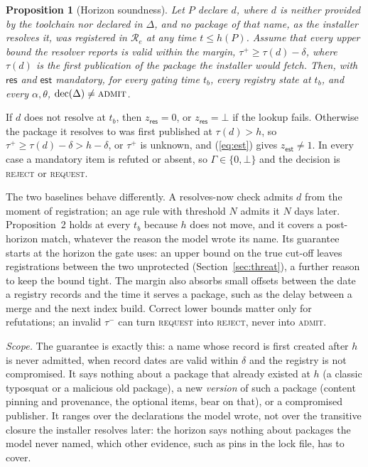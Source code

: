\documentclass[conference]{IEEEtran}
\newcommand{\sres}{\mathsf{res}}
\newcommand{\sest}{\mathsf{est}}
\newcommand{\dec}[1]{\textsc{#1}}
\newcommand{\Reg}{\mathcal{R}}
\newcommand{\Dec}{\mathrm{dec}}
\newtheorem{proposition}{Proposition}
\begin{document}
\begin{proposition}[Horizon soundness]
Let $P$ declare $d$, where $d$ is neither provided by the toolchain nor declared in $\Delta$, and no package of that
name, as the installer resolves it, was registered in $\Reg_e$ at any time $t\le h(P)$. Assume that every upper
bound the resolver reports is valid within the margin, $\tau^{+}\ge\tau(d)-\delta$, where $\tau(d)$ is the
first publication of the package the installer would fetch. Then, with $\sres$ and $\sest$ mandatory, for every gating
time $t_b$, every registry state at $t_b$, and every $\alpha,\theta$, $\Dec(\Delta)\neq\dec{admit}$.
\end{proposition}
\begin{IEEEproof}
If $d$ does not resolve at $t_b$, then $z_{\sres}=0$, or $z_{\sres}=\bot$ if the lookup fails. Otherwise the package it
resolves to was first published at $\tau(d)>h$, so $\tau^{+}\ge\tau(d)-\delta>h-\delta$, or $\tau^{+}$ is unknown, and
(\ref{eq:est}) gives $z_{\sest}\neq 1$. In every case a mandatory item is refuted or absent, so $\Gamma\in\{0,\bot\}$
and the decision is \dec{reject} or \dec{request}.
\end{IEEEproof}
The two baselines behave differently. A resolves-now check admits $d$ from the moment of registration; an age rule with
threshold $N$ admits it $N$ days later. Proposition~2 holds at every $t_b$ because $h$ does not move, and it covers a
post-horizon match, whatever the reason the model wrote its name. Its guarantee starts at the horizon the gate uses:
an upper bound on the true cut-off leaves registrations between the two unprotected (Section~\ref{sec:threat}), a
further reason to keep the bound tight. The margin also absorbs small offsets between the date a registry records and the time it serves a
package, such as the delay between a merge and the next index build. Correct lower bounds matter only for
refutations; an invalid $\tau^{-}$ can turn \dec{request} into \dec{reject}, never into \dec{admit}.

\emph{Scope.} The guarantee is exactly this: a name whose record is first created after $h$ is never admitted, when
record dates are valid within $\delta$ and the registry is not compromised. It says nothing about a package that
already existed at $h$ (a classic typosquat or a malicious old package), a new \emph{version} of such a package
(content pinning and provenance, the optional items, bear on that), or a compromised publisher. It ranges over the
declarations the model wrote, not over the transitive closure the installer resolves later: the horizon says nothing
about packages the model never named, which other evidence, such as pins in the lock file, has to cover.
\end{document}
